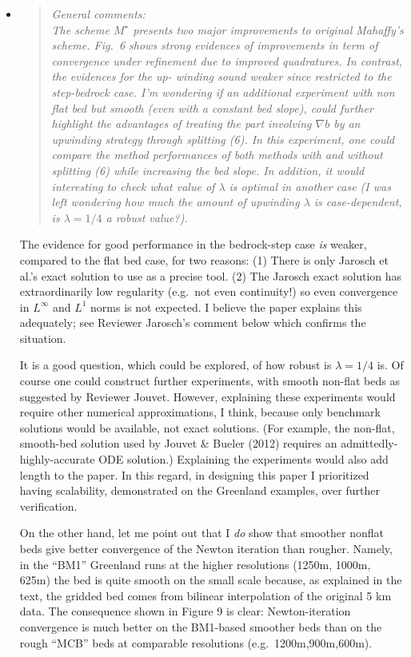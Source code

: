 \documentclass[11pt,reqno]{amsart}
\newcommand{\grad}{\nabla}
\newcommand{\reply}[2]{
\medskip\medskip
\item  \begin{quote}
\emph{#1}
\end{quote}

\medskip
\noindent #2}
\begin{document}
\begin{itemize}
\reply{General comments: \medskip \\
The scheme $M^\star$ presents two major improvements to original Mahaffy's scheme.
Fig.~6 shows strong evidences of improvements in term of convergence under
refinement due to improved quadratures. In contrast, the evidences for the up-
winding sound weaker since restricted to the step-bedrock case. I'm wondering
if an additional experiment with non flat bed but smooth (even with a constant
bed slope), could further highlight the advantages of treating the part involving
$\grad b$ by an upwinding strategy through splitting (6).  In this experiment, one could
compare the method performances of both methods with and without splitting
(6) while increasing the bed slope. In addition, it would interesting to check what
value of $\lambda$ is optimal in another case (I was left wondering how much the amount
of upwinding $\lambda$ is case-dependent, is $\lambda = 1/4$ a robust value?).}
{The evidence for good performance in the bedrock-step case \emph{is} weaker, compared to the flat bed case, for two reasons: (1) There is only Jarosch et al.'s exact solution to use as a precise tool.  (2) The Jarosch exact solution has extraordinarily low regularity (e.g.~not even continuity!) so even convergence in $L^\infty$ and $L^1$ norms is not expected.  I believe the paper explains this adequately; see Reviewer Jarosch's comment below which confirms the situation.

It is a good question, which could be explored, of how robust is $\lambda=1/4$ is.  Of course one could construct further experiments, with smooth non-flat beds as suggested by Reviewer Jouvet.  However, explaining these experiments would require other numerical approximations, I think, because only benchmark solutions would be available, not exact solutions.  (For example, the non-flat, smooth-bed solution used by Jouvet \& Bueler (2012) requires an admittedly-highly-accurate ODE solution.)  Explaining the experiments would also add length to the paper.  In this regard, in designing this paper I prioritized having scalability, demonstrated on the Greenland examples, over further verification.

On the other hand, let me point out that I \emph{do} show that smoother nonflat beds give better convergence of the Newton iteration than rougher.  Namely, in the ``BM1'' Greenland runs at the higher resolutions (1250m, 1000m, 625m) the bed is quite smooth on the small scale because, as explained in the text, the gridded bed comes from bilinear interpolation of the original 5 km data.  The consequence shown in Figure 9 is clear: Newton-iteration convergence is much better on the BM1-based smoother beds than on the rough ``MCB'' beds at comparable resolutions (e.g.~1200m,900m,600m).}


\end{itemize}
\end{document}

